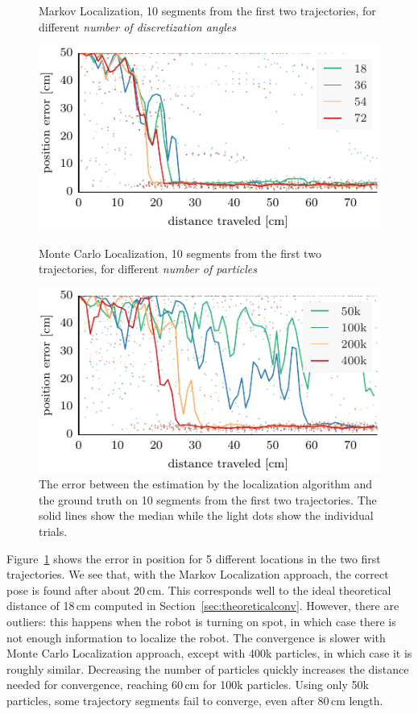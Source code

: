 \documentclass[letterpaper, 10pt, conference]{ieeeconf}
\newcommand{\Fig}[1]{Figure~\ref{fig:#1}}
\newcommand{\sect}[1]{Section~\ref{sec:#1}}
\begin{document}
\begin{figure}

\begin{center}
Markov Localization, 10 segments from the first two trajectories, for different \emph{number of discretization angles}
\end{center}
\includegraphics{ml-small_runs_random_12-xy}

\vspace{.3em}

\begin{center}
Monte Carlo Localization, 10 segments from the first two trajectories, for different \emph{number of particles}
\end{center}
\includegraphics{mcl-small_runs_random_12-xy}

\caption{
The error between the estimation by the localization algorithm and the ground truth on 10 segments from the first two trajectories.
The solid lines show the median while the light dots show the individual trials.}
\label{fig:small-runs}
\end{figure}

\Fig{small-runs} shows the error in position for 5 different locations in the two first trajectories.
We see that, with the Markov Localization approach, the correct pose is found after about 20\,cm.
This corresponds well to the ideal theoretical distance of 18\,cm computed in \sect{theoreticalconv}.
However, there are outliers: this happens when the robot is turning on spot, in which case there is not enough information to localize the robot.
The convergence is slower with Monte Carlo Localization approach, except with 400k particles, in which case it is roughly similar.
Decreasing the number of particles quickly increases the distance needed for convergence, reaching 60\,cm for 100k particles.
Using only 50k particles, some trajectory segments fail to converge, even after 80\,cm length.
\end{document}
